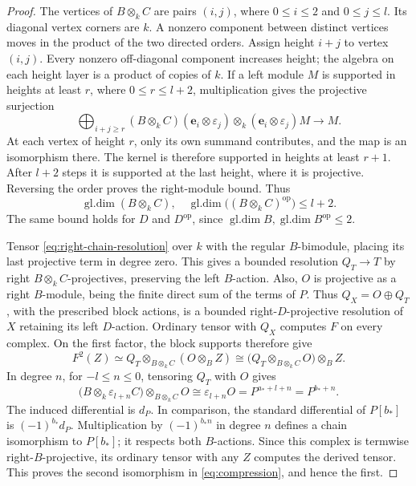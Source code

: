 \documentclass[11pt]{article}
\numberwithin{equation}{section}
\theoremstyle{definition}
\theoremstyle{remark}
\DeclareMathOperator{\gldim}{gl.dim}
\begin{document}
\begin{proof}
The vertices of \(B\otimes_k C\) are pairs \((i,j)\), where
\(0\le i\le2\) and \(0\le j\le l\).  Its diagonal vertex
corners are \(k\).  A nonzero component between distinct
vertices moves in the product of the two directed orders.
Assign height $i+j$ to vertex $(i,j)$. Every nonzero
off-diagonal component increases height; the algebra on each height
layer is a product of copies of $k$. If a left module $M$ is supported
in heights at least $r$, where $0\le r\le l+2$, multiplication gives
the projective surjection
\[
 \bigoplus_{i+j\ge r}(B\otimes_k C)
 (\mathbf e_i\otimes\varepsilon_j)\otimes_k
 (\mathbf e_i\otimes\varepsilon_j)M\longrightarrow M.
\]
At each vertex of height $r$, only its own summand contributes, and
the map is an isomorphism there. The kernel is therefore supported
in heights at least $r+1$. After $l+2$ steps it is supported at the
last height, where it is projective. Reversing the order proves the
right-module bound. Thus
\[
\gldim(B\otimes_k C),\quad
\gldim\bigl((B\otimes_k C)^{\mathrm{op}}\bigr)\le l+2.
\]
The same bound holds for $D$ and $D^{\mathrm{op}}$, since
$\gldim B,\gldim B^{\mathrm{op}}\le2$.

Tensor \eqref{eq:right-chain-resolution} over \(k\) with
the regular \(B\)-bimodule, placing its last projective term
in degree zero.  This gives a bounded resolution \(Q_T\to T\)
by right \(B\otimes_k C\)-projectives, preserving the left
\(B\)-action.  Also, \(O\) is projective as a right
\(B\)-module, being the finite direct sum of the terms of \(P\).
Thus \(Q_X=O\oplus Q_T\), with the prescribed block actions,
is a bounded right-\(D\)-projective resolution of \(X\) retaining
its left \(D\)-action.  Ordinary tensor with \(Q_X\) computes
\(F\) on every complex.  On the first factor, the block supports
therefore give
\[
F^2(Z)\simeq
Q_T\otimes_{B\otimes_k C}(O\otimes_B Z)
\cong
\bigl(Q_T\otimes_{B\otimes_k C}O\bigr)\otimes_B Z.
\]
In degree \(n\), for \(-l\le n\le0\), tensoring \(Q_T\)
with \(O\) gives
\[
\bigl(B\otimes_k\varepsilon_{l+n}C\bigr)
\otimes_{B\otimes_k C}O
\cong\varepsilon_{l+n}O
=P^{a_*+l+n}=P^{b_*+n}.
\]
The induced differential is \(d_P\).
In comparison, the standard differential of \(P[b_*]\) is
\((-1)^{b_*}d_P\).  Multiplication by
\((-1)^{b_*n}\) in degree \(n\) defines a chain isomorphism
to \(P[b_*]\); it respects both \(B\)-actions.
Since this complex is termwise right-\(B\)-projective, its
ordinary tensor with any \(Z\) computes the derived tensor.
This proves the second isomorphism in
\eqref{eq:compression}, and hence the first.
\end{proof}
\end{document}
